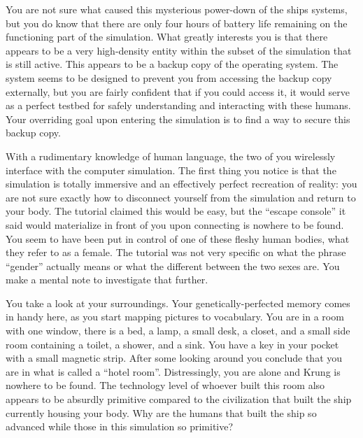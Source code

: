 \documentclass[char]{guildcamp1}
\begin{document}
You are not sure what caused this mysterious power-down of the ships systems, but you do know that there are only four hours of battery life remaining on the functioning part of the simulation. What greatly interests you is that there appears to be a very high-density entity within the subset of the simulation that is still active. This appears to be a backup copy of the operating system. The system seems to be designed to prevent you from accessing the backup copy externally, but you are fairly confident that if you could access it, it would serve as a perfect testbed for safely understanding and interacting with these humans. Your overriding goal upon entering the simulation is to find a way to secure this backup copy.

With a rudimentary knowledge of human language, the two of you wirelessly interface with the computer simulation. The first thing you notice is that the simulation is totally immersive and an effectively perfect recreation of reality: you are not sure exactly how to disconnect yourself from the simulation and return to your body. The tutorial claimed this would be easy, but the ``escape console'' it said would materialize in front of you upon connecting is nowhere to be found. You seem to have been put in control of one of these fleshy human bodies, what they refer to as a female. The tutorial was not very specific on what the phrase ``gender'' actually means or what the different between the two sexes are. You make a mental note to investigate that further.

You take a look at your surroundings. Your genetically-perfected memory comes in handy here, as you start mapping pictures to vocabulary. You are in a room with one window, there is a bed, a lamp, a small desk, a closet, and a small side room containing a toilet, a shower, and a sink. You have a key in your pocket with a small magnetic strip. After some looking around you conclude that you are in what is called a ``hotel room''. Distressingly, you are alone and Krung is nowhere to be found. The technology level of whoever built this room also appears to be absurdly primitive compared to the civilization that built the ship currently housing your body. Why are the humans that built the ship so advanced while those in this simulation so primitive?
\end{document}

